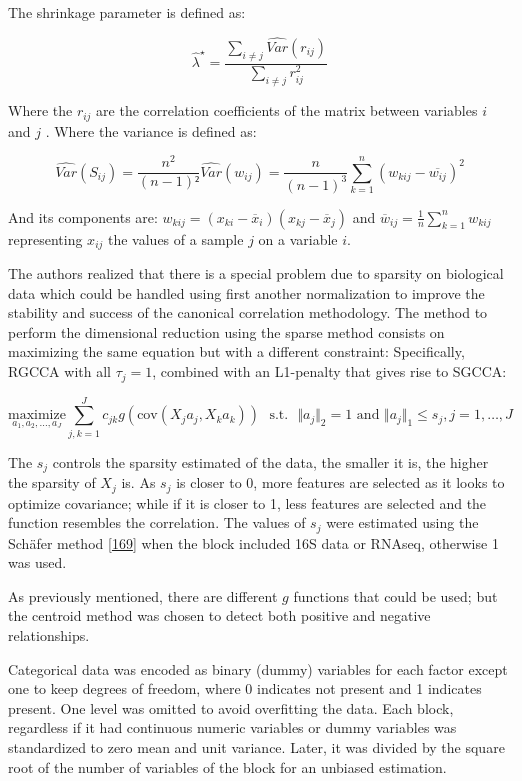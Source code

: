 \documentclass[
  12pt,
  a4paper,
  twoside,
  openright]{book}
\begin{document}
The shrinkage parameter is defined as:

\[
\widehat{\lambda}^{\star} = \dfrac{\sum_{i\neq j}\widehat{Var}(r_{ij})}{\sum_{i \neq j}r_{ij}^2}
\]

Where the \(r_{ij}\) are the correlation coefficients of the matrix between variables \(i\) and \(j\) .
Where the variance is defined as:

\[
\widehat{Var}(S_{ij}) = \dfrac{n^2}{{(n-1)}²} \widehat{Var}({w}_{ij}) = \dfrac{n}{{(n-1)}^3} \sum_{k=1}^n ( w_{kij} - \overline{w_{ij}})^2
\]

And its components are: \(w_{kij}=(x_{ki}-\overline{x}_i)(x_{kj}-\overline{x}_j)\) and \(\overline{w}_{ij}=\frac{1}{n}\sum_{k=1}^nw_{kij}\) representing \(x_{ij}\) the values of a sample \(j\) on a variable \(i\).

The authors realized that there is a special problem due to sparsity on biological data which could be handled using first another normalization to improve the stability and success of the canonical correlation methodology.
The method to perform the dimensional reduction using the sparse method consists on maximizing the same equation but with a different constraint: Specifically, RGCCA with all \(\tau_j = 1\), combined with an L1-penalty that gives rise to SGCCA:

\[
\underset{a_1,a_2, \dots,a_J}{\text{maximize}} \sum_{j, k = 1}^J c_{jk}g( \text{cov}(X_j a_j, X_k a_k)) \text{~~s.t.~~} \Vert a_j \Vert_2 = 1 \text{ and } \Vert a_j \Vert_1 \le s_j, j=1,\ldots,J
\]

The \(s_j\) controls the sparsity estimated of the data, the smaller it is, the higher the sparsity of \(X_j\) is.
As \(s_j\) is closer to 0, more features are selected as it looks to optimize covariance; while if it is closer to 1, less features are selected and the function resembles the correlation.
The values of \(s_j\) were estimated using the Schäfer method {[}\protect\hyperlink{ref-schuxe4fer2005}{169}{]} when the block included 16S data or RNAseq, otherwise 1 was used.

As previously mentioned, there are different \(g\) functions that could be used; but the centroid method was chosen to detect both positive and negative relationships.

Categorical data was encoded as binary (dummy) variables for each factor except one to keep degrees of freedom, where 0 indicates not present and 1 indicates present.
One level was omitted to avoid overfitting the data.
Each block, regardless if it had continuous numeric variables or dummy variables was standardized to zero mean and unit variance.
Later, it was divided by the square root of the number of variables of the block for an unbiased estimation.
\end{document}
